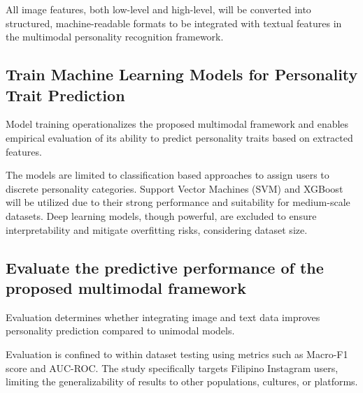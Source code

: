 	All image features, both low-level and high-level, will be converted into structured, machine-readable formats to be integrated with textual features in the multimodal personality recognition framework.
	
	\subsection{Train Machine Learning Models for Personality Trait Prediction
	}
	
	Model training operationalizes the proposed multimodal framework and enables empirical evaluation of its ability to predict personality traits based on extracted features.

	The models are limited to classification based approaches to assign users to discrete personality categories. Support Vector Machines (SVM) and XGBoost will be utilized due to their strong performance and suitability for medium-scale datasets. Deep learning models, though powerful, are excluded to ensure interpretability and mitigate overfitting risks, considering dataset size.
	
	\subsection{Evaluate the predictive performance of the proposed multimodal framework}
	
	Evaluation determines whether integrating image and text data improves personality prediction compared to unimodal models.
	
	Evaluation is confined to within dataset testing using metrics such as Macro-F1 score and AUC-ROC. The study specifically targets Filipino Instagram users, limiting the generalizability of results to other populations, cultures, or platforms.
	



